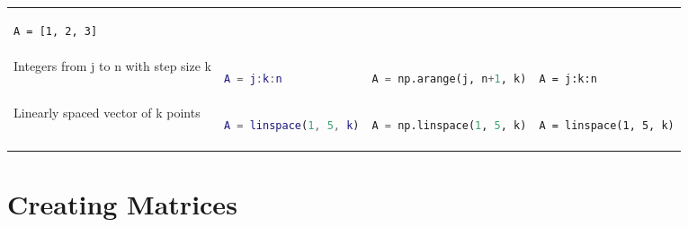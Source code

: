 \documentclass[10pt, landscape]{article}
\begin{document}
\begin{multicols}{2}
\begin{tabular}[]{@{}llll@{}}
\begin{minipage}[t]{0.19\columnwidth}
\begin{lstlisting}
A = [1, 2, 3]
\end{lstlisting}
\strut
\end{minipage}\tabularnewline
\begin{minipage}[t]{0.21\columnwidth}\raggedright\strut
Integers from j to n with step size k\strut
\end{minipage} & \begin{minipage}[t]{0.19\columnwidth}\raggedright\strut
\begin{lstlisting}[language=Matlab]
A = j:k:n
\end{lstlisting}
\strut
\end{minipage} & \begin{minipage}[t]{0.29\columnwidth}\raggedright\strut
\begin{lstlisting}[language=Python]
A = np.arange(j, n+1, k)
\end{lstlisting}
\strut
\end{minipage} & \begin{minipage}[t]{0.19\columnwidth}\raggedright\strut
\begin{lstlisting}
A = j:k:n
\end{lstlisting}
\strut
\end{minipage}\tabularnewline
\begin{minipage}[t]{0.21\columnwidth}\raggedright\strut
Linearly spaced vector of k points\strut
\end{minipage} & \begin{minipage}[t]{0.19\columnwidth}\raggedright\strut
\begin{lstlisting}[language=Matlab]
A = linspace(1, 5, k)
\end{lstlisting}
\strut
\end{minipage} & \begin{minipage}[t]{0.29\columnwidth}\raggedright\strut
\begin{lstlisting}[language=Python]
A = np.linspace(1, 5, k)
\end{lstlisting}
\strut
\end{minipage} & \begin{minipage}[t]{0.19\columnwidth}\raggedright\strut
\begin{lstlisting}
A = linspace(1, 5, k)
\end{lstlisting}
\strut
\end{minipage}\tabularnewline
\bottomrule
\end{tabular}

\section{Creating Matrices}\label{creating-matrices}


\end{multicols}
\end{document}
